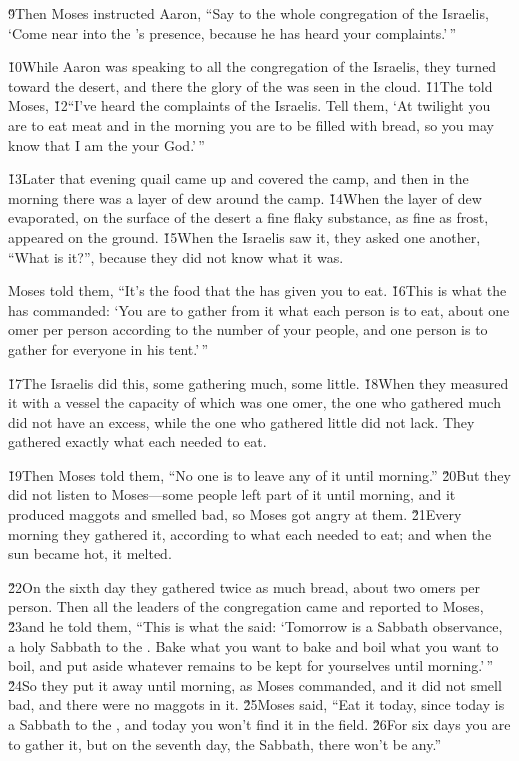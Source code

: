 \v{9}Then Moses instructed Aaron, ``Say to the whole congregation of the Israelis, `Come near into the 's presence, because he has heard your complaints.'\,''

\v{10}While Aaron was speaking to all the congregation of the Israelis, they turned toward the desert, and there the glory of the  was seen in the cloud. \v{11}The  told Moses, \v{12}``I've heard the complaints of the Israelis. Tell them, `At twilight you are to eat meat and in the morning you are to be filled with bread, so you may know that I am the  your God.'\,''

\v{13}Later that evening quail came up and covered the camp, and then in the morning there was a layer of dew around the camp. \v{14}When the layer of dew evaporated, on the surface of the desert a fine flaky substance, as fine as frost, appeared on the ground. \v{15}When the Israelis saw it, they asked one another, ``What is it?'', because they did not know what it was.

Moses told them, ``It's the food that the  has given you to eat. \v{16}This is what the  has commanded: `You are to gather from it what each person is to eat, about one omer per person according to the number of your people, and one person is to gather for everyone in his tent.'\,''

\v{17}The Israelis did this, some gathering much, some little. \v{18}When they measured it with a vessel the capacity of which was one omer, the one who gathered much did not have an excess, while the one who gathered little did not lack. They gathered exactly what each needed to eat.

\v{19}Then Moses told them, ``No one is to leave any of it until morning.'' \v{20}But they did not listen to Moses---some people left part of it until morning, and it produced maggots and smelled bad, so Moses got angry at them. \v{21}Every morning they gathered it, according to what each needed to eat; and when the sun became hot, it melted.

\v{22}On the sixth day they gathered twice as much bread, about two omers per person. Then all the leaders of the congregation came and reported to Moses, \v{23}and he told them, ``This is what the  said: `Tomorrow is a Sabbath observance, a holy Sabbath to the . Bake what you want to bake and boil what you want to boil, and put aside whatever remains to be kept for yourselves until morning.'\,'' \v{24}So they put it away until morning, as Moses commanded, and it did not smell bad, and there were no maggots in it. \v{25}Moses said, ``Eat it today, since today is a Sabbath to the , and today you won't find it in the field. \v{26}For six days you are to gather it, but on the seventh day, the Sabbath, there won't be any.''

